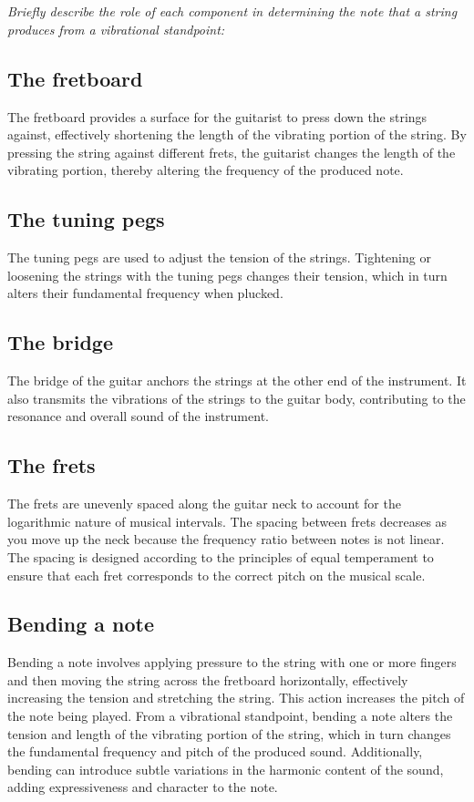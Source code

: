 \section{}
\textit{Briefly describe the role of each component in determining the note that a string produces from a vibrational standpoint:}

\subsection{The fretboard}
The fretboard provides a surface for the guitarist to press down the strings against, effectively shortening the length of the vibrating portion of the string. By pressing the string against different frets, the guitarist changes the length of the vibrating portion, thereby altering the frequency of the produced note.

\subsection{The tuning pegs}
The tuning pegs are used to adjust the tension of the strings. Tightening or loosening the strings with the tuning pegs changes their tension, which in turn alters their fundamental frequency when plucked.

\subsection{The bridge}
The bridge of the guitar anchors the strings at the other end of the instrument. It also transmits the vibrations of the strings to the guitar body, contributing to the resonance and overall sound of the instrument.

\subsection{The frets}
The frets are unevenly spaced along the guitar neck to account for the logarithmic nature of musical intervals. The spacing between frets decreases as you move up the neck because the frequency ratio between notes is not linear. The spacing is designed according to the principles of equal temperament to ensure that each fret corresponds to the correct pitch on the musical scale.

\subsection{Bending a note}
Bending a note involves applying pressure to the string with one or more fingers and then moving the string across the fretboard horizontally, effectively increasing the tension and stretching the string. This action increases the pitch of the note being played. From a vibrational standpoint, bending a note alters the tension and length of the vibrating portion of the string, which in turn changes the fundamental frequency and pitch of the produced sound. Additionally, bending can introduce subtle variations in the harmonic content of the sound, adding expressiveness and character to the note.
